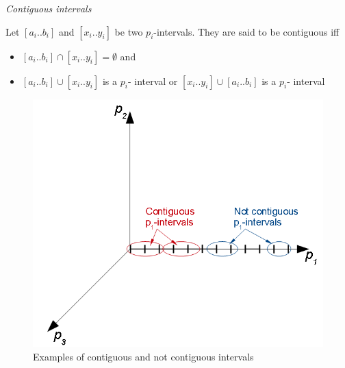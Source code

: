 \begin{defn}
\emph{\label{pers02.def:Contiguous-intervals}Contiguous intervals}

Let $\left[a_{i}..b_{i}\right]$ and $\left[x_{i}..y_{i}\right]$
be two $p_{i}$-intervals. They are said to be contiguous iff
\begin{itemize}
\item $\left[a_{i}..b_{i}\right]\cap\left[x_{i}..y_{i}\right]=\emptyset$
and
\item $\left[a_{i}..b_{i}\right]\cup\left[x_{i}..y_{i}\right]$ is a $p_{i}$-
interval or $\left[x_{i}..y_{i}\right]\cup\left[a_{i}..b_{i}\right]$
is a $p_{i}$- interval
\end{itemize}
\end{defn}
\begin{figure}[h]
\includegraphics[width=0.9\columnwidth]{img/contiguous_intervals_or_not}

\caption{Examples of contiguous and not contiguous intervals}

\end{figure}

